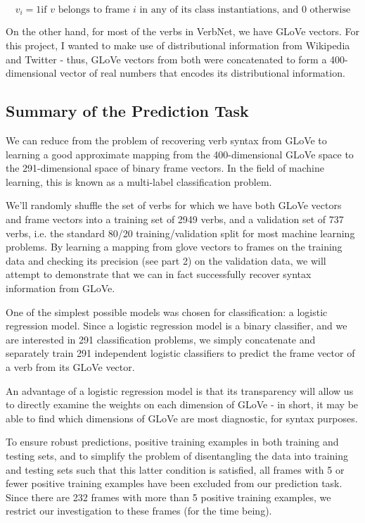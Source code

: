 \documentclass[a4paper]{article}
\begin{document}
	\[ v_i =1  \text{if $v$ belongs to frame $i$ in any of its class instantiations, and 0 otherwise} \]

On the other hand, for most of the verbs in VerbNet, we have GLoVe vectors. For this project, I wanted to make use of distributional information from Wikipedia and Twitter - thus, GLoVe vectors from both were concatenated to form a 400-dimensional vector of real numbers that encodes its distributional information. 

\subsection{Summary of the Prediction Task}

We can reduce from the problem of recovering verb syntax from GLoVe to learning a good approximate mapping from the 400-dimensional GLoVe space to the 291-dimensional space of binary frame vectors. In the field of machine learning, this is known as a multi-label classification problem.

We’ll randomly shuffle the set of verbs for which we have both GLoVe vectors and frame vectors into a training set of 2949 verbs, and a validation set of 737 verbs, i.e. the standard 80/20 training/validation split for most machine learning problems. By learning a mapping from glove vectors to frames on the training data and checking its precision (see part 2) on the validation data, we will attempt to demonstrate that we can in fact successfully recover syntax information from GLoVe.

One of the simplest possible models was chosen for classification: a logistic regression model. Since a logistic regression model is a binary classifier, and we are interested in 291 classification problems, we simply concatenate and separately train 291 independent logistic classifiers to predict the frame vector of a verb from its GLoVe vector.

An advantage of a logistic regression model is that its transparency will allow us to directly examine the weights on each dimension of GLoVe - in short, it may be able to find which dimensions of GLoVe are most diagnostic, for syntax purposes.

To ensure robust predictions, positive training examples in both training and testing sets, and to simplify the problem of disentangling the data into training and testing sets such that this latter condition is satisfied, all frames with 5 or fewer positive training examples have been excluded from our prediction task. Since there are 232 frames with more than 5 positive training examples, we restrict our investigation to these frames (for the time being).
\end{document}
